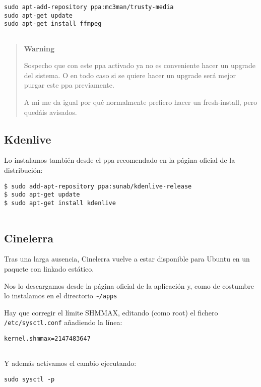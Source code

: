 \begin{verbatim}
sudo apt-add-repository ppa:mc3man/trusty-media
sudo apt-get update
sudo apt-get install ffmpeg
     
\end{verbatim}

\begin{quote}
\textbf{Warning}

Sospecho que con este ppa activado ya no es conveniente hacer un upgrade
del sistema. O en todo caso si se quiere hacer un upgrade será mejor
purgar este ppa previamente.

A mi me da igual por qué normalmente prefiero hacer un fresh-install,
pero quedáis avisados.
\end{quote}

\subsection{Kdenlive}\label{kdenlive}

Lo instalamos también desde el ppa recomendado en la página oficial de
la distribución:

\begin{verbatim}
$ sudo add-apt-repository ppa:sunab/kdenlive-release
$ sudo apt-get update
$ sudo apt-get install kdenlive
     
\end{verbatim}

\subsection{Cinelerra}\label{cinelerra}

Tras una larga ausencia, Cinelerra vuelve a estar disponible para Ubuntu
en un paquete con linkado estático.

Nos lo descargamos desde la página oficial de la aplicación y, como de
costumbre lo instalamos en el directorio \texttt{\textasciitilde{}/apps}

Hay que corregir el límite SHMMAX, editando (como root) el fichero
\texttt{/etc/sysctl.conf} añadiendo la línea:

\begin{verbatim}
kernel.shmmax=2147483647
     
\end{verbatim}

Y además activamos el cambio ejecutando:

\begin{verbatim}
sudo sysctl -p
     
\end{verbatim}


